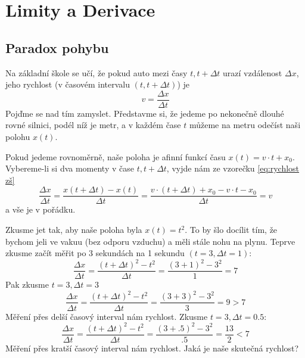 \chapter{Limity a Derivace} \label{ch:Limity a Derivace}

\section{Paradox pohybu}\label{sec:Paradox pohybu}
Na základní škole se učí, že pokud auto mezi časy $t, t+\Delta t$ urazí vzdálenost $\Delta x$, jeho rychlost (v časovém intervalu $(t,t+\Delta t)$) je
\begin{equation}\label{eq:rychlost zš}
  v = \frac{\Delta x}{\Delta t}
\end{equation}
Pojďme se nad tím zamyslet. Představme si, že jedeme po nekonečně dlouhé rovné silnici, podél níž je metr, a v každém čase $t$ můžeme na metru odečíst naši polohu $x(t).$

\begin{příklad}\label{pr:x(t)=vt+x_0}
	Pokud jedeme rovnoměrně, naše poloha je afinní funkcí času $x(t)=v\cdot t+x_0.$ Vybereme-li si dva momenty v čase $t, t+\Delta t$, vyjde nám ze vzorečku \ref{eq:rychlost zš}
	\begin{equation*}
	  \frac{\Delta x}{\Delta t}=\frac{x(t+\Delta t)-x(t)}{\Delta t}=\frac{v\cdot (t+\Delta t)+x_0-v\cdot t - x_0}{\Delta t} = v
	\end{equation*}
	a vše je v pořádku.
\end{příklad}

\begin{příklad}\label{pr:x(t)=t^2}
  Zkusme jet tak, aby naše poloha byla $x(t)=t^{2}$. To by šlo docílit tím, že bychom jeli ve vakuu (bez odporu vzduchu) a měli stále nohu na plynu. Teprve zkusme začít měřit po 3 sekundách na 1 sekundu $(t=3, \Delta t = 1):$
  \begin{equation*}
    \frac{\Delta x}{\Delta t}=\frac{(t+\Delta t)^{2}-t^{2}}{\Delta t}=\frac{(3+1)^{2}-3^{2}}{1}=7
  \end{equation*}
  Pak zkusme $t=3, \Delta t=3$
  \begin{equation*}
    \frac{\Delta x}{\Delta t}=\frac{(t+\Delta t)^{2}-t^{2}}{\Delta t}=\frac{(3+3)^{2}-3^{2}}{3}=9>7
  \end{equation*}
  Měření přes delší časový interval nám  rychlost. Zkusme $t=3, \Delta t=0.5$:
  \begin{equation*}
	  \frac{\Delta x}{\Delta t}=\frac{(t+\Delta t)^{2}-t^{2}}{\Delta t}=\frac{(3+.5)^{2}-3^{2}}{.5}=\frac{13}{2}<7
  \end{equation*}
  Měření přes kratší časový interval nám  rychlost. Jaká je naše skutečná rychlost? 
\end{příklad}


